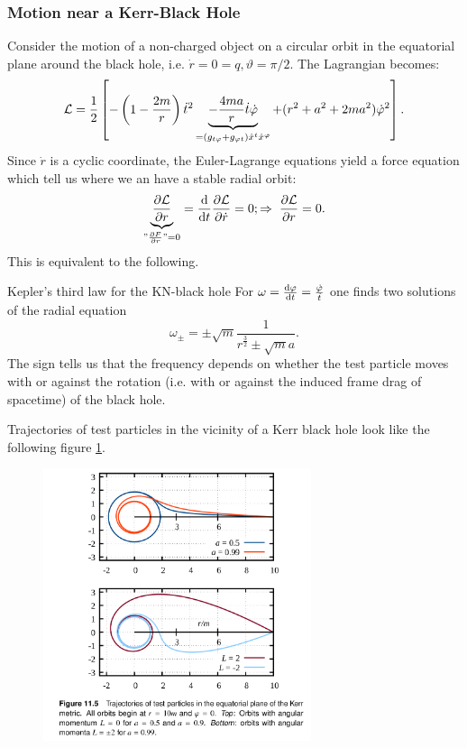 \subsubsection{Motion near a Kerr-Black Hole}
	Consider the motion of a non-charged object on a circular orbit in the equatorial plane around the black hole, i.e. $\dot{r}=0=q, \vartheta=\pi/2$.
	The Lagrangian becomes:
	\begin{equation}
		\mathcal{L} = \frac{1}{2} \left[- \left(1 - \frac{2m}{r} \right) \dot{t}^2 \underbrace{- \frac{4 m a}{r} \dot{t} \dot{\varphi}}_{=(g_{t\varphi}+g_{\varphi t}) \dot{x}^t \dot{x}^{\varphi}} + (r^2+a^2+2ma^2) \dot{\varphi}^2\right].
	\end{equation}
	Since $\dot{r}$ is a cyclic coordinate, the Euler-Lagrange equations yield a force equation which tell us where we an have a stable radial orbit:
	\begin{equation}
		\underbrace{\frac{\partial \mathcal{L}}{\partial r}}_{"\frac{\partial F}{\partial r}"=0} = \frac{\mathrm{d}}{\mathrm{d} t} \frac{\partial \mathcal{L}}{\partial \dot{r}}=0 ;\Rightarrow\;\frac{\partial \mathcal{L}}{\partial r} = 0.
	\end{equation}
 This is equivalent to the following.
 \begin{mybox}{Kepler's third law for the KN-black hole}
 	For $\omega=\frac{\mathrm{d} \varphi}{\mathrm{d} t} = \frac{\dot{\varphi}}{\dot{t}}$ one finds two solutions of the radial equation
 	\begin{equation}
 		\omega_{\pm} = \pm \sqrt{m} \frac{1}{r^{\frac{3}{2}} \pm \sqrt{m}a}.
 	\end{equation}
 	The sign tells us that the frequency depends on whether the test particle moves with or against the rotation (i.e. with or against the induced frame drag of spacetime) of the black hole.
 \end{mybox}
Trajectories of test particles in the vicinity of a Kerr black hole look like the following figure \ref{fig:trajectorieskerrbh}.
\begin{figure}
	\centering
	\includegraphics[width=0.7\textwidth]{gfx/TrajectoriesKerrBH}
	\caption{}
	\label{fig:trajectorieskerrbh}
\end{figure}
	
